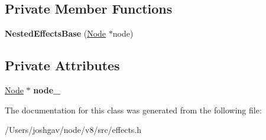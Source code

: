 \subsection*{Private Member Functions}
\begin{DoxyCompactItemize}
\item 
{\bfseries Nested\+Effects\+Base} (\hyperlink{structv8_1_1internal_1_1_nested_effects_base_1_1_node}{Node} $\ast$node)\hypertarget{classv8_1_1internal_1_1_nested_effects_base_aa452203e2328c3cfbd6bf2e7c43acc7b}{}\label{classv8_1_1internal_1_1_nested_effects_base_aa452203e2328c3cfbd6bf2e7c43acc7b}

\end{DoxyCompactItemize}
\subsection*{Private Attributes}
\begin{DoxyCompactItemize}
\item 
\hyperlink{structv8_1_1internal_1_1_nested_effects_base_1_1_node}{Node} $\ast$ {\bfseries node\+\_\+}\hypertarget{classv8_1_1internal_1_1_nested_effects_base_af6ce031b14f8dce13ddcf65683fcaeaa}{}\label{classv8_1_1internal_1_1_nested_effects_base_af6ce031b14f8dce13ddcf65683fcaeaa}

\end{DoxyCompactItemize}


The documentation for this class was generated from the following file\+:\begin{DoxyCompactItemize}
\item 
/\+Users/joshgav/node/v8/src/effects.\+h\end{DoxyCompactItemize}
